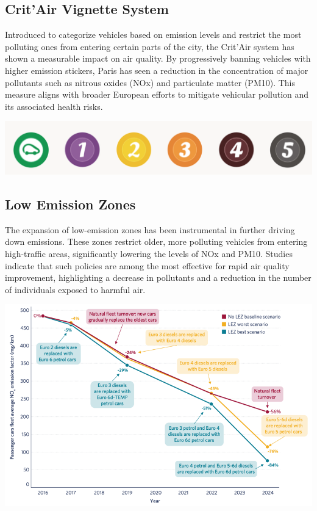 \documentclass{modeleRapport}
\begin{document}
\subsection{Crit'Air Vignette System}

Introduced to categorize vehicles based on emission levels and restrict the most polluting ones from entering certain 
parts of the city, the Crit’Air system\cite{CritAir} has shown a measurable impact on air quality. By progressively banning vehicles 
with higher emission stickers, Paris has seen a reduction in the concentration of major pollutants such as nitrous oxides 
(NOx) and particulate matter (PM10). This measure aligns with broader European efforts to mitigate vehicular pollution and 
its associated health risks.\\

\begin{center}
    \includegraphics[width=15cm]{Images/CritAir.png}
\end{center}

\newpage
\subsection{Low Emission Zones}

The expansion of low-emission zones\cite{LEZ1}\cite{LEZ2} has been instrumental in further driving down emissions. These zones restrict older, 
more polluting vehicles from entering high-traffic areas, significantly lowering the levels of NOx and PM10. Studies indicate 
that such policies are among the most effective for rapid air quality improvement, highlighting a decrease in pollutants 
and a reduction in the number of individuals exposed to harmful air. \cite{LEZ3}\\

\begin{center}
    \includegraphics[width=16cm]{Images/LEZ.png}
\end{center}
\end{document}
